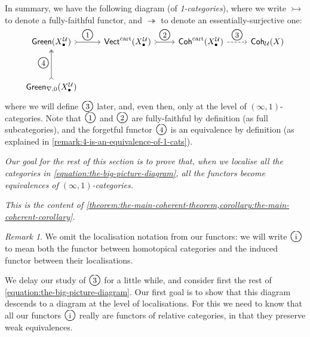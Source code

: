 \documentclass[11pt,fleqn]{article}
\theoremstyle{plain}
\theoremstyle{definition}
\theoremstyle{remark}
\newtheorem{remark}[theorem]{Remark}
\numberwithin{equation}{theorem}
\newcommand{\cover}{\mathcal{U}}
\newcommand{\gcohUX}{\mathsf{Coh}_{\cover}(X)}
\newcommand{\cartvectX}{\mathsf{Vect}^\mathrm{cart}(X_\bullet^\cover)}
\newcommand{\cartcohX}{\mathsf{Coh}^\mathrm{cart}(X_\bullet^\cover)}
\newcommand{\greenX}{\mathsf{Green}(X_\bullet^\cover)}
\newcommand{\greenzeroX}{\mathsf{Green}_{\nabla,0}(X_\bullet^\cover)}
\newcommand{\numberincircle}[1]{\text{\Large\textcircled{\small #1}}}
\begin{document}
        In summary, we have the following diagram (of \emph{1-categories}), where we write $\rightarrowtail$ to denote a fully-faithful functor, and $\twoheadrightarrow$ to denote an essentially-surjective one:
        \begin{equation}
        \label{equation:the-big-picture-diagram}
            \begin{tikzcd}[row sep=huge]
                \greenX
                    \ar[r,tail,"\numberincircle{1}"]
                & \cartvectX
                    \ar[r,tail,"\numberincircle{2}"]
                & \cartcohX
                    \ar[r,dashed,"\numberincircle{3}"]
                & \gcohUX\\
                \greenzeroX
                    \ar[u,tail,two heads,"\numberincircle{4}"]
            \end{tikzcd}
        \end{equation}
        where we will define $\numberincircle{3}$ later, and, even then, only at the level of $(\infty,1)$-categories.
        Note that $\numberincircle{1}$ and $\numberincircle{2}$ are fully-faithful by definition (as full subcategories), and the forgetful functor $\numberincircle{4}$ is an equivalence by definition (as explained in \cref{remark:4-is-an-equivalence-of-1-cats}).

        \bigskip

        \begin{center}
            \emph{Our goal for the rest of this section is to prove that, when we localise all the categories in \cref{equation:the-big-picture-diagram}, all the functors become equivalences of $(\infty,1)$-categories.}

            \emph{This is the content of \cref{theorem:the-main-coherent-theorem,corollary:the-main-coherent-corollary}.}
        \end{center}

        \medskip

        \begin{remark}
            We omit the localisation notation from our functors: we will write $\numberincircle{i}$ to mean both the functor between homotopical categories and the induced functor between their localisations.
        \end{remark}
        
        We delay our study of $\numberincircle{3}$ for a little while, and consider first the rest of \cref{equation:the-big-picture-diagram}.
        Our first goal is to show that this diagram descends to a diagram at the level of localisations.
        For this we need to know that all our functors $\numberincircle{i}$ really are functors of relative categories, in that they preserve weak equivalences.
\end{document}

